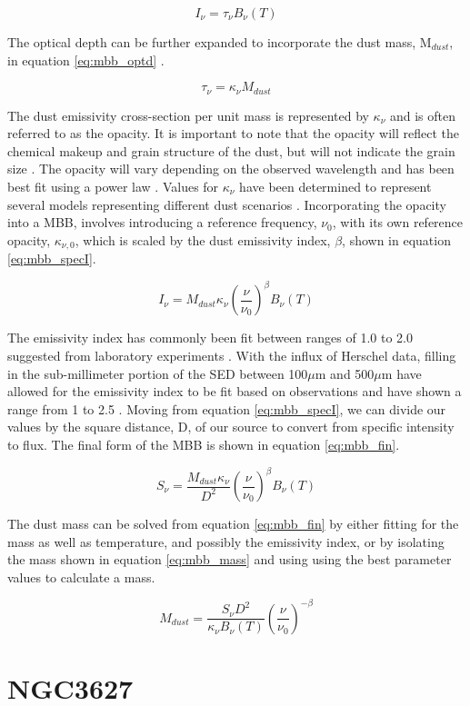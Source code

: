 \begin{equation}\label{eq:mbb_basic}
  I_\nu = \tau_\nu B_\nu\left(T\right)
\end{equation}

The optical depth can be further expanded to incorporate the dust mass, M$_{dust}$, in equation \ref{eq:mbb_optd} \citep{planckXI2013}.

\begin{equation}\label{eq:mbb_optd}
  \tau_\nu = \kappa_\nu M_{dust}
\end{equation}

The dust emissivity cross-section per unit mass is represented by $\kappa_\nu$ and is often referred to as the opacity.  It is important to note that the opacity will reflect the chemical makeup and grain structure of the dust, but will not indicate the grain size \citep{planckXI2013}.  The opacity will vary depending on the observed wavelength and has been best fit using a power law \citep{hildebrand1983}.  Values for $\kappa_\nu$ have been determined to represent several models representing different dust scenarios \citep{li2001,planckxxv20011}. Incorporating the opacity into a MBB, involves introducing a reference frequency, $\nu_0$, with its own reference opacity, $\kappa_{\nu,0}$, which is scaled by the dust emissivity index, $\beta$, shown in equation \ref{eq:mbb_specI}.

\begin{equation}\label{eq:mbb_specI}
  I_\nu = M_{dust} \kappa_\nu \left(\frac{\nu}{\nu_0}\right)^\beta B_\nu\left(T\right)
\end{equation}

The emissivity index has commonly been fit between ranges of 1.0 to 2.0  suggested from laboratory experiments \citep{walcher2011}.  With the influx of Herschel data, filling in the sub-millimeter portion of the SED between 100$\mu$m and 500$\mu$m have allowed for the emissivity index to be fit based on observations and have shown a range from 1 to 2.5 \citep{galametz2012}.  Moving from equation \ref{eq:mbb_specI}, we can divide our values by the square distance, D, of our source to convert from specific intensity to flux.  The final form of the MBB is shown in equation \ref{eq:mbb_fin}.

\begin{equation}\label{eq:mbb_fin}
  S_\nu=\frac{M_{dust}\kappa_\nu}{D^2}\left(\frac{\nu}{\nu_0}\right)^\beta B_\nu\left(T\right)
\end{equation}

The dust mass can be solved from equation \ref{eq:mbb_fin} by either fitting for the mass as well as temperature, and possibly the emissivity index, or by isolating the mass shown in equation \ref{eq:mbb_mass} and using using the best parameter values to calculate a mass.

\begin{equation}\label{eq:mbb_mass}
  M_{dust} = \frac{S_\nu D^2}{\kappa_\nu B_\nu\left(T\right)}\left(\frac{\nu}{\nu_0}\right)^{-\beta}
\end{equation}

\section{NGC3627}